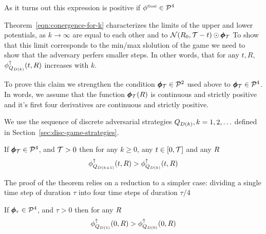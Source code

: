 \documentclass[anon,12pt]{colt2024} %
\begin{document}
As it turns out this expression is positive if $\phi^{\mbox{\tiny final}} \in {\cal P}^{4}$



Theorem~\ref{eqn:conergence-for-k} characterizes the limits of the
upper and lower potentials, as $k \to \infty$ are equal to each
other and to ${\cal N}(R_0,\mathcal{T}-t) \odot \pmb{\phi}_{\mathcal{T}}$ To show
that this limit corresponds to the min/max slolution of the game
we need to show that the adversary perfers smaller steps. In other
words, that for any $t,R$, $\phi_{Q_{D(k)}}^{\uparrow}(t,R)$ increases with
$k$.

To prove this claim we strengthen the condition $\pmb{\phi}_{\mathcal{T}} \in {\cal P}^{2}$ used above to $\pmb{\phi}_{\mathcal{T}} \in {\cal P}^{4}$. In words, we assume that the function $\pmb{\phi}_{\mathcal{T}}(R)$ is continuous and strictly positive and it's first four derivatives are continuous and strictly positive.

We use the sequence of discrete adversarial strategies
$Q_{D(k)}, k=1,2,\ldots$ defined in
Section~\ref{sec:disc-game-strategies}.

\begin{theorem}\label{thm:smallerSteps}
  If $ \pmb{\phi}_{\mathcal{T}} \in {\cal P}^{4}$, and $\mathcal{T}>0$  
  then for any $k\geq 0$, any $t \in [0,\mathcal{T}]$ and any $R$
  $$\phi_{Q_{D(k+1)}}^{\uparrow}(t,R) >  \phi_{Q_{D(k)}}^{\uparrow}(t,R)$$
\end{theorem}

The proof of the theorem relies on a reduction to a simpler case:
dividing a single time step of duration $\tau$ into four time steps of duration  $\tau/4$

\begin{lemma} \label{lemma:half-step}
  If $ \pmb{\phi}_{\tau} \in {\cal P}^{4}$, and $\tau>0$ then for any $R$
  $$\phi_{Q_{D(1)}}^{\uparrow}(0,R) >  \phi_{Q_{D(0)}}^{\uparrow}(0,R)$$
\end{lemma}
  
\end{document}
